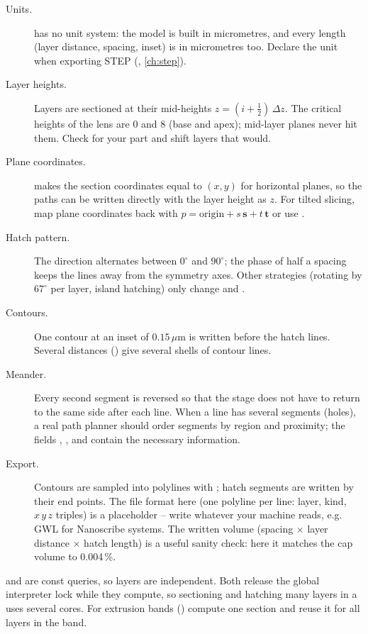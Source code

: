 \begin{description}
\item[Units.] \NF{} has no unit system: the model is built in micrometres, and every length
(layer distance, spacing, inset) is in micrometres too. Declare the unit when exporting STEP
(, \cref{ch:step}).
\item[Layer heights.] Layers are sectioned at their mid-heights $z = (i+\tfrac12)\,\Delta z$.
The critical heights of the lens are $0$ and $8$ (base and apex); mid-layer planes never hit
them. Check  for your part and shift layers that would.
\item[Plane coordinates.]  makes the section coordinates equal to
$(x, y)$ for horizontal planes, so the paths can be written directly with the layer height as
$z$. For tilted slicing, map plane coordinates back with
$p = \mathrm{origin} + s\,\mathbf{s} + t\,\mathbf{t}$ or use .
\item[Hatch pattern.] The direction alternates between $0^\circ$ and $90^\circ$; the phase of
half a spacing keeps the lines away from the symmetry axes. Other strategies (rotating by
$67^\circ$ per layer, island hatching) only change  and .
\item[Contours.] One contour at an inset of $0.15\,\mu$m is written before the hatch lines.
Several distances () give several shells of contour lines.
\item[Meander.] Every second segment is reversed so that the stage does not have to return
to the same side after each line. When a line has several segments (holes), a real path
planner should order segments by region and proximity; the fields , ,
 and  contain the necessary information.
\item[Export.] Contours are sampled into polylines with ; hatch
segments are written by their end points. The file format here (one polyline per line:
layer, kind, $x\,y\,z$ triples) is a placeholder -- write whatever your machine reads, e.g.
GWL for Nanoscribe systems. The written volume (spacing $\times$ layer distance $\times$
hatch length) is a useful sanity check: here it matches the cap volume to 0.004\,\%.
\end{description}

\begin{tip}[Performance]
 and  are const queries, so layers are independent. Both release
the global interpreter lock while they compute, so sectioning and hatching many layers in a
 uses several cores. For extrusion bands () compute
one section and reuse it for all layers in the band.
\end{tip}
